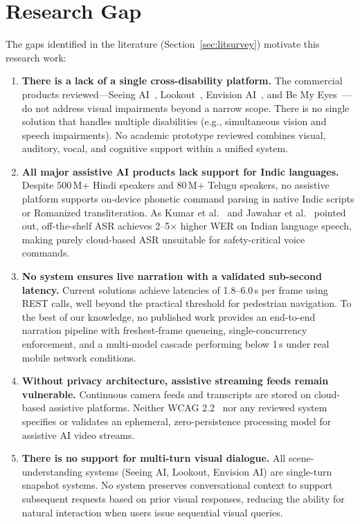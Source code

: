 \documentclass[pdflatex,sn-mathphys-num]{sn-jnl}
\theoremstyle{thmstyleone}%
\theoremstyle{thmstyletwo}%
\theoremstyle{thmstylethree}%
\begin{document}
\section{Research Gap}\label{sec:gap}

The gaps identified in the literature (Section~\ref{sec:litsurvey}) motivate this research work:

\begin{enumerate}

\item \textbf{There is a lack of a single cross-disability platform.}
The commercial products reviewed---Seeing AI~\cite{microsoftSeeingAI}, Lookout~\cite{lookout2020},
Envision AI~\cite{envision2022}, and Be My Eyes~\cite{bemyeyes2021}---do not address
visual impairments beyond a narrow scope. There is no single solution that handles multiple
disabilities (e.g., simultaneous vision and speech impairments). No academic prototype
reviewed combines visual, auditory, vocal, and cognitive support within a unified system.

\item \textbf{All major assistive AI products lack support for Indic languages.}
Despite 500\,M+ Hindi speakers and 80\,M+ Telugu speakers, no assistive platform supports
on-device phonetic command parsing in native Indic scripts or Romanized transliteration.
As Kumar et al.~\cite{kumar2022indic} and Jawahar et al.~\cite{jawahar2021indicnlp} pointed
out, off-the-shelf ASR achieves 2--5$\times$ higher WER on Indian language speech, making
purely cloud-based ASR unsuitable for safety-critical voice commands.

\item \textbf{No system ensures live narration with a validated sub-second latency.}
Current solutions achieve latencies of 1.8--6.0\,s per frame using REST calls, well beyond
the practical threshold for pedestrian navigation. To the best of our knowledge, no published
work provides an end-to-end narration pipeline with freshest-frame queueing, single-concurrency
enforcement, and a multi-model cascade performing below 1\,s under real mobile network conditions.

\item \textbf{Without privacy architecture, assistive streaming feeds remain vulnerable.}
Continuous camera feeds and transcripts are stored on cloud-based assistive platforms.
Neither WCAG 2.2~\cite{w3c2023wcag} nor any reviewed system specifies or validates an
ephemeral, zero-persistence processing model for assistive AI video streams.

\item \textbf{There is no support for multi-turn visual dialogue.}
All scene-understanding systems (Seeing AI, Lookout, Envision AI) are single-turn snapshot
systems. No system preserves conversational context to support subsequent requests based on
prior visual responses, reducing the ability for natural interaction when users issue
sequential visual queries.

\end{enumerate}
\end{document}
